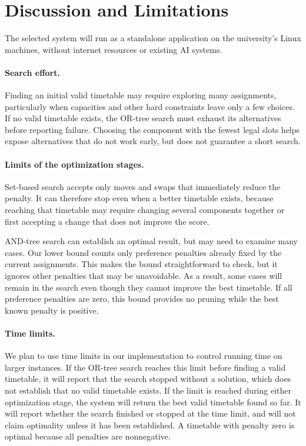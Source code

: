 \section{Discussion and Limitations}
\label{sec:discussion}

The selected system will run as a standalone application on
the university's Linux machines, without internet resources
or existing AI systems.

\paragraph{Search effort.}
Finding an initial valid timetable may require exploring many
assignments, particularly when capacities and other hard
constraints leave only a few choices. If no valid timetable exists,
the OR-tree search must exhaust its alternatives before
reporting failure. Choosing the component with the fewest
legal slots helps expose alternatives that do not work early, but does not
guarantee a short search.

\paragraph{Limits of the optimization stages.}
Set-based search accepts only moves and swaps that immediately
reduce the penalty. It can therefore stop even when a better
timetable exists, because reaching that timetable may require
changing several components together or first accepting a
change that does not improve the score.

AND-tree search can establish an optimal result, but may need
to examine many cases. Our lower bound counts only preference
penalties already fixed by the current assignments. This makes
the bound straightforward to check, but it ignores other
penalties that may be unavoidable. As a result, some cases
will remain in the search even though they cannot improve
the best timetable. If all preference penalties are zero,
this bound provides no pruning while the best known penalty
is positive.

\paragraph{Time limits.}
We plan to use time limits in our implementation to control running
time on larger instances. If the OR-tree search reaches this
limit before finding a valid timetable, it will report that
the search stopped without a solution, which does not establish that no valid timetable exists. If the limit is reached during
either optimization stage, the system will return the best
valid timetable found so far. It will report whether the search
finished or stopped at the time limit, and will not claim
optimality unless it has been established. A timetable with
penalty zero is optimal because all penalties are nonnegative.

